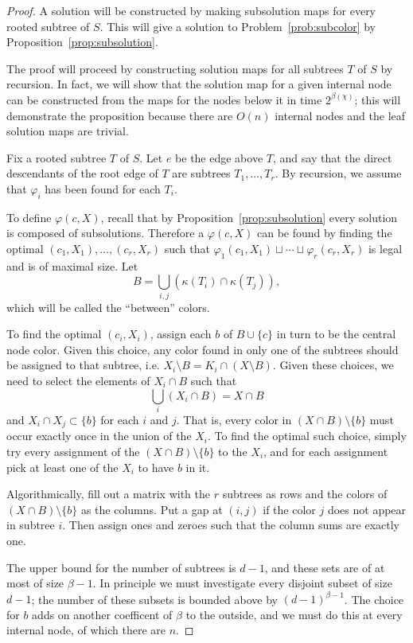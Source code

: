 \documentclass{amsart}
\newcommand{\col}{\chi}
\newcommand{\subunion}{\sqcup}
\newcommand{\cut}{\kappa}
\newcommand{\bad}{\beta}
\begin{document}
\begin{proof}

A solution will be constructed by making subsolution maps for every rooted subtree of $S$.
This will give a solution to Problem~\ref{prob:subcolor} by Proposition~\ref{prop:subsolution}.

The proof will proceed by constructing solution maps for all subtrees $T$ of $S$ by recursion.
In fact, we will show that the solution map for a given internal node can be constructed from the maps for the nodes below it in time $2^{\bad(\col)}$;
this will demonstrate the proposition because there are $O(n)$ internal nodes and the leaf solution maps are trivial.

Fix a rooted subtree $T$ of $S$.
Let $e$ be the edge above $T$, and say that the direct descendants of the root edge of $T$ are subtrees $T_1,\ldots,T_r$.
By recursion, we assume that $\varphi_i$ has been found for each $T_i$.

To define $\varphi(c,X)$, recall that by Proposition~\ref{prop:subsolution} every solution is composed of subsolutions.
Therefore a $\varphi(c,X)$ can be found by finding the optimal $(c_1,X_1),\ldots,(c_r,X_r)$ such that $\varphi_1(c_1,X_1) \subunion \cdots \subunion \varphi_r(c_r,X_r)$ is legal and is of maximal size.
Let
\[
  B = \bigcup_{i,j} \left( \cut(T_i) \cap \cut(T_j) \right),
\]
which will be called the ``between'' colors.

To find the optimal $(c_i, X_i)$, assign each $b$ of $B \cup \{c\}$ in turn to be the central node color.
Given this choice, any color found in only one of the subtrees should be assigned to that subtree, i.e. $X_i \setminus B = K_i \cap (X \setminus B)$.
Given these choices, we need to select the elements of $X_i \cap B$ such that
\[
  \bigcup_{i} (X_i \cap B) = X \cap B
\]
and $X_i \cap X_j \subset \{b\}$ for each $i$ and $j$.
That is, every color in $(X \cap B) \setminus \{b\}$ must occur exactly once in the union of the $X_i$.
To find the optimal such choice, simply try every assignment of the $(X \cap B) \setminus \{b\}$ to the $X_i$, and for each assignment pick at least one of the $X_i$ to have $b$ in it.

Algorithmically, fill out a matrix with the $r$ subtrees as rows and the colors of $(X \cap B) \setminus \{b\}$ as the columns.
Put a gap at $(i,j)$ if the color $j$ does not appear in subtree $i$.
Then assign ones and zeroes such that the column sums are exactly one.

The upper bound for the number of subtrees is $d-1$, and these sets are of at most of size $\bad-1$.
In principle we must investigate every disjoint subset of size $d-1$; the number of these subsets is bounded above by $(d-1)^{\bad-1}$.
The choice for $b$ adds on another coefficent of $\bad$ to the outside, and we must do this at every internal node, of which there are $n$.
\end{proof}
\end{document}
